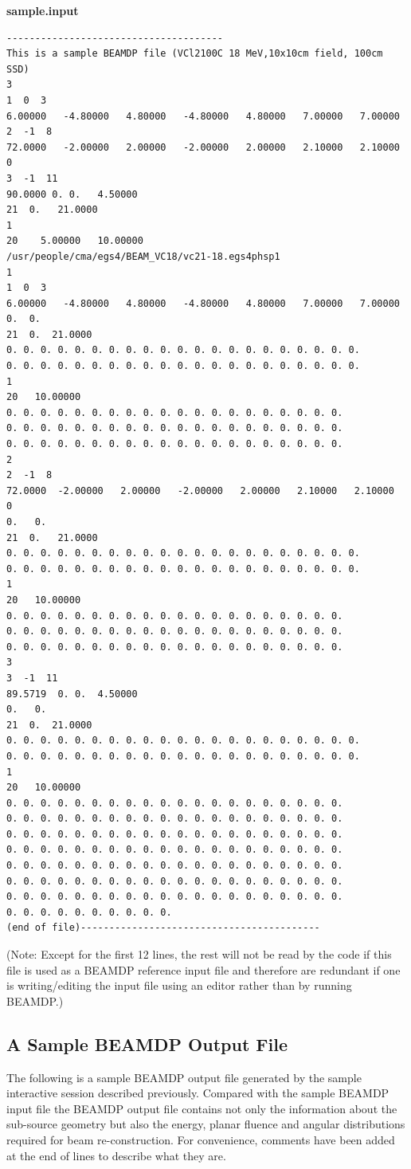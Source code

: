 \documentclass[12pt,twoside]{article}
\begin{document}
{\bf sample.input}
\begin{verbatim}
--------------------------------------
This is a sample BEAMDP file (VCl2100C 18 MeV,10x10cm field, 100cm SSD)
3
1  0  3
6.00000   -4.80000   4.80000   -4.80000   4.80000   7.00000   7.00000
2  -1  8
72.0000   -2.00000   2.00000   -2.00000   2.00000   2.10000   2.10000  0
3  -1  11
90.0000 0. 0.   4.50000
21  0.   21.0000
1
20    5.00000   10.00000
/usr/people/cma/egs4/BEAM_VC18/vc21-18.egs4phsp1
1
1  0  3
6.00000   -4.80000   4.80000   -4.80000   4.80000   7.00000   7.00000
0.  0.
21  0.  21.0000
0. 0. 0. 0. 0. 0. 0. 0. 0. 0. 0. 0. 0. 0. 0. 0. 0. 0. 0. 0. 0.
0. 0. 0. 0. 0. 0. 0. 0. 0. 0. 0. 0. 0. 0. 0. 0. 0. 0. 0. 0. 0.
1
20   10.00000
0. 0. 0. 0. 0. 0. 0. 0. 0. 0. 0. 0. 0. 0. 0. 0. 0. 0. 0. 0.
0. 0. 0. 0. 0. 0. 0. 0. 0. 0. 0. 0. 0. 0. 0. 0. 0. 0. 0. 0.
0. 0. 0. 0. 0. 0. 0. 0. 0. 0. 0. 0. 0. 0. 0. 0. 0. 0. 0. 0.
2
2  -1  8
72.0000  -2.00000   2.00000   -2.00000   2.00000   2.10000   2.10000  0
0.   0.
21  0.   21.0000
0. 0. 0. 0. 0. 0. 0. 0. 0. 0. 0. 0. 0. 0. 0. 0. 0. 0. 0. 0. 0.
0. 0. 0. 0. 0. 0. 0. 0. 0. 0. 0. 0. 0. 0. 0. 0. 0. 0. 0. 0. 0.
1
20   10.00000
0. 0. 0. 0. 0. 0. 0. 0. 0. 0. 0. 0. 0. 0. 0. 0. 0. 0. 0. 0.
0. 0. 0. 0. 0. 0. 0. 0. 0. 0. 0. 0. 0. 0. 0. 0. 0. 0. 0. 0.
0. 0. 0. 0. 0. 0. 0. 0. 0. 0. 0. 0. 0. 0. 0. 0. 0. 0. 0. 0.
3
3  -1  11
89.5719  0. 0.  4.50000
0.   0.
21  0.  21.0000
0. 0. 0. 0. 0. 0. 0. 0. 0. 0. 0. 0. 0. 0. 0. 0. 0. 0. 0. 0. 0.
0. 0. 0. 0. 0. 0. 0. 0. 0. 0. 0. 0. 0. 0. 0. 0. 0. 0. 0. 0. 0.
1
20   10.00000
0. 0. 0. 0. 0. 0. 0. 0. 0. 0. 0. 0. 0. 0. 0. 0. 0. 0. 0. 0.
0. 0. 0. 0. 0. 0. 0. 0. 0. 0. 0. 0. 0. 0. 0. 0. 0. 0. 0. 0.
0. 0. 0. 0. 0. 0. 0. 0. 0. 0. 0. 0. 0. 0. 0. 0. 0. 0. 0. 0.
0. 0. 0. 0. 0. 0. 0. 0. 0. 0. 0. 0. 0. 0. 0. 0. 0. 0. 0. 0.
0. 0. 0. 0. 0. 0. 0. 0. 0. 0. 0. 0. 0. 0. 0. 0. 0. 0. 0. 0.
0. 0. 0. 0. 0. 0. 0. 0. 0. 0. 0. 0. 0. 0. 0. 0. 0. 0. 0. 0.
0. 0. 0. 0. 0. 0. 0. 0. 0. 0. 0. 0. 0. 0. 0. 0. 0. 0. 0. 0.
0. 0. 0. 0. 0. 0. 0. 0. 0. 0.
(end of file)------------------------------------------
\end{verbatim}

(Note: Except for the first 12 lines, the rest will not be read by the code if this file is used as a BEAMDP reference input file and therefore are redundant if one is writing/editing the input file using an editor rather than by running BEAMDP.)

\subsection{A Sample BEAMDP Output File}
The following is a sample BEAMDP output file generated by the sample interactive session described previously. Compared with the sample BEAMDP input file the BEAMDP output file contains not only the information about the sub-source geometry but also the energy, planar fluence and angular distributions required for beam re-construction. For convenience, comments have been added at the end of lines to describe what they are.
\end{document}

